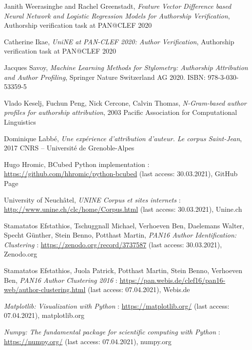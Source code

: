 \begin{thebibliography}{9}
Janith Weerasinghe and Rachel Greenstadt,
\textit{Feature Vector Difference based Neural Network and Logistic Regression Models for Authorship Verification},
Authorship verification task at PAN@CLEF 2020

Catherine Ikae,
\textit{UniNE at PAN-CLEF 2020: Author Verification},
Authorship verification task at PAN@CLEF 2020

Jacques Savoy,
\textit{Machine Learning Methods for Stylometry: Authorship Attribution and Author Profiling},
Springer Nature Switzerland AG 2020. ISBN: 978-3-030-53359-5

Vlado Keselj, Fuchun Peng, Nick Cercone, Calvin Thomas,
\textit{N-Gram-based author profiles for authorship attribution},
2003 Pacific Association for Computational Linguistics

Dominique Labbé,
\textit{Une expérience d’attribution d’auteur. Le corpus Saint-Jean},
2017 CNRS – Université de Grenoble-Alpes


Hugo Hromic,
BCubed Python implementation : \url{https://github.com/hhromic/python-bcubed} (last access: 30.03.2021),
GitHub Page

University of Neuchâtel,
\textit{UNINE Corpus et sites internets} : \url{http://www.unine.ch/clc/home/Corpus.html} (last access: 30.03.2021),
Unine.ch

Stamatatos Efstathios, Tschuggnall Michael, Verhoeven Ben, Daelemans Walter, Specht Günther, Stein Benno, Potthast Martin,
\textit{PAN16 Author Identification: Clustering} : \url{https://zenodo.org/record/3737587} (last access: 30.03.2021),
Zenodo.org

Stamatatos Efstathios, Juola Patrick, Potthast Martin, Stein Benno, Verhoeven Ben,
\textit{PAN16 Author Clustering 2016} : \url{https://pan.webis.de/clef16/pan16-web/author-clustering.html} (last access: 07.04.2021),
Webis.de


\textit{Matplotlib: Visualization with Python} : \url{https://matplotlib.org/} (last access: 07.04.2021),
matplotlib.org

\textit{Numpy: The fundamental package for scientific computing with Python} : \url{https://numpy.org/} (last access: 07.04.2021),
numpy.org


\end{thebibliography}
